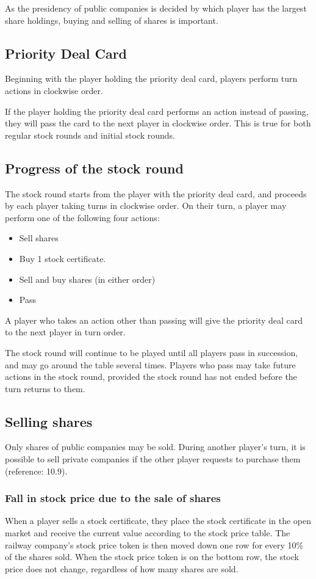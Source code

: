 \documentclass{article}
\begin{document}
\begin{CJK}{UTF8}{min}
\begin{multicols}{2}
As the presidency of public companies is decided by which player has
the largest share holdings, buying and selling of shares is important.

\subsection{Priority Deal Card}
Beginning with the player holding the priority deal card, players
perform turn actions in clockwise order.

If the player holding the priority deal card performs an action
instead of passing, they will pass the card to the next player in
clockwise order. This is true for both regular stock rounds and
initial stock rounds.

\subsection{Progress of the stock round}
The stock round starts from the player with the priority deal card,
and proceeds by each player taking turns in clockwise order. On their
turn, a player may perform one of the following four actions:
\begin{itemize}
\item Sell shares
\item Buy 1 stock certificate.
\item Sell and buy shares (in either order)
\item Pass
\end{itemize}

A player who takes an action other than passing will give the priority
deal card to the next player in turn order.

The stock round will continue to be played until all players pass in
succession, and may go around the table several times. Players who
pass may take future actions in the stock round, provided the stock
round has not ended before the turn returns to them.

\subsection{Selling shares}
Only shares of public companies may be sold. During another player's
turn, it is possible to sell private companies if the other player
requests to purchase them (reference: 10.9).

\subsubsection{Fall in stock price due to the sale of shares}
\label{sr-sell-price-drop}
When a player sells a stock certificate, they place the stock
certificate in the open market and receive the current value according
to the stock price table. The railway company's stock price token is then moved
down one row for every 10\% of the shares sold. When the stock price token
is on the bottom row, the stock price does not change, regardless of
how many shares are sold.


\end{multicols}
\end{CJK}
\end{document}
